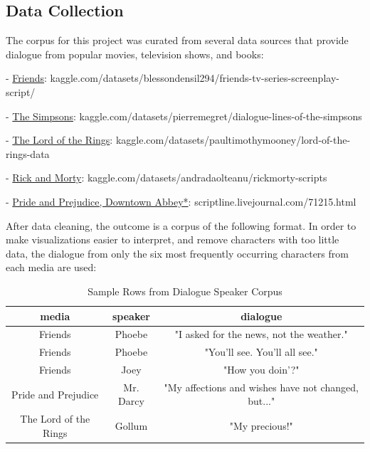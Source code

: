 \documentclass{article}
\begin{document}
\begin{titlepage}

\section{Data Collection}

The corpus for this project was curated from several data sources that provide dialogue from popular movies, television shows, and books:

- \href{https://www.kaggle.com/datasets/blessondensil294/friends-tv-series-screenplay-script/data?select=S01E01+Monica+Gets+A+Roommate.txt}{Friends}: kaggle.com/datasets/blessondensil294/friends-tv-series-screenplay-script/
 
- \href{https://www.kaggle.com/datasets/pierremegret/dialogue-lines-of-the-simpsons}{The Simpsons}: kaggle.com/datasets/pierremegret/dialogue-lines-of-the-simpsons

- \href{https://www.kaggle.com/datasets/paultimothymooney/lord-of-the-rings-data?select=lotr_scripts.csv}{The Lord of the Rings}: kaggle.com/datasets/paultimothymooney/lord-of-the-rings-data

- \href{https://www.kaggle.com/datasets/andradaolteanu/rickmorty-scripts}{Rick and Morty}: kaggle.com/datasets/andradaolteanu/rickmorty-scripts

- \href{https://scriptline.livejournal.com/71215.html#cutid6}{Pride and Prejudice, Downtown Abbey*}: scriptline.livejournal.com/71215.html

After data cleaning, the outcome is a corpus of the following format. In order to make visualizations easier to interpret, and remove characters with too little data, the dialogue from only the six most frequently occurring characters from each media are used:

\begin{table}[H]
    \centering
    \begin{tabular}{|c|c|c|}
        \hline
        \textbf{} \textbf{media} & \textbf{speaker} & \textbf{dialogue} \\
        \hline
        Friends & Phoebe &  "I asked for the news, not the weather." \\
        Friends & Phoebe &  "You'll see. You'll all see." \\
        Friends & Joey &  "How you doin'?" \\
        Pride and Prejudice & Mr. Darcy &  "My affections and wishes have not changed, but..."  \\
        The Lord of the Rings & Gollum &  "My precious!" \\
        \hline
    \end{tabular}
    \caption{Sample Rows from Dialogue Speaker Corpus}
    \label{tab:images}
\end{table}


\end{titlepage}
\end{document}
